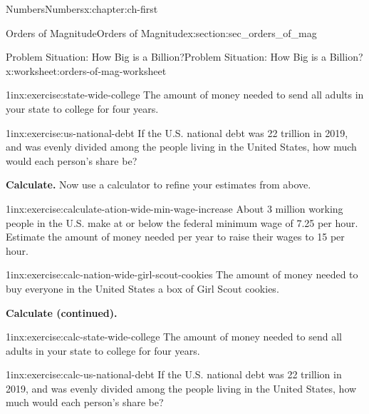 \documentclass[twoside,10pt,]{book}
\numberwithin{equation}{chapter}
\begin{document}
\begin{chapterptx}{Numbers}{}{Numbers}{}{}{x:chapter:ch-first}
\begin{sectionptx}{Orders of Magnitude}{}{Orders of Magnitude}{}{}{x:section:sec_orders_of_mag}
\begin{worksheet-subsection-numberless}{Problem Situation: How Big is a Billion?}{}{Problem Situation: How Big is a Billion?}{}{}{x:worksheet:orders-of-mag-worksheet}
\begin{exercisegroup}
\begin{divisionexerciseeg}{15}{}{1in}{x:exercise:state-wide-college}
The amount of money needed to send all adults in your state to college for four years.\end{divisionexerciseeg}%
\begin{divisionexerciseeg}{16}{}{1in}{x:exercise:us-national-debt}%
If the U.S. national debt was \textdollar{}22 trillion in 2019, and was evenly divided among the people living in the United States, how much would each person's share be?\end{divisionexerciseeg}%
\end{exercisegroup}
\par\medskip\noindent
\par\medskip\noindent%
\textbf{Calculate.}\space\space%
Now use a calculator to refine your estimates from above.\begin{exercisegroup}
\begin{divisionexerciseeg}{17}{}{1in}{x:exercise:calculate-ation-wide-min-wage-increase}%
About 3 million working people in the U.S. make at or below the federal minimum wage of \textdollar{}7.25 per hour.  Estimate the amount of money needed per year to raise their wages to \textdollar{}15 per hour.\end{divisionexerciseeg}%
\begin{divisionexerciseeg}{18}{}{1in}{x:exercise:calc-nation-wide-girl-scout-cookies}%
The amount of money needed to buy everyone in the United States a box of Girl Scout cookies.\end{divisionexerciseeg}%
\end{exercisegroup}
\par\medskip\noindent
\clearpage
\par\medskip\noindent%
\textbf{Calculate (continued).}\space\space%
\begin{exercisegroup}
\begin{divisionexerciseeg}{19}{}{1in}{x:exercise:calc-state-wide-college}%
The amount of money needed to send all adults in your state to college for four years.\end{divisionexerciseeg}%
\begin{divisionexerciseeg}{20}{}{1in}{x:exercise:calc-us-national-debt}%
If the U.S. national debt was \textdollar{}22 trillion in 2019, and was evenly divided among the people living in the United States, how much would each person's share be?\end{divisionexerciseeg}%
\end{exercisegroup}
\par\medskip\noindent
\par\medskip\noindent%

\end{worksheet-subsection-numberless}
\end{sectionptx}
\end{chapterptx}
\end{document}
